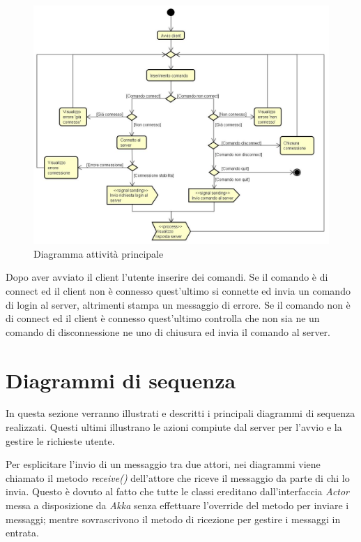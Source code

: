 \documentclass[a4paper]{article}
\begin{document}
		\begin{figure} [H]
			\centering
			\includegraphics[width=\textwidth]{ST/Attivita/attivitaPrincipale.jpg}
			\caption{Diagramma attività principale}
		\end{figure}
		Dopo aver avviato il client l'utente inserire dei comandi. Se il comando è di connect ed il client non è connesso quest'ultimo si connette ed invia un comando di login al server, altrimenti stampa un messaggio di errore. Se il comando non è di connect ed il client è connesso quest'ultimo controlla che non sia ne un comando di disconnessione ne uno di chiusura ed invia il comando al server.
		
	\newpage 
	\section{Diagrammi di sequenza}
        In questa sezione verranno illustrati e descritti i principali diagrammi di sequenza realizzati. Questi ultimi illustrano le azioni compiute dal server per l'avvio e la gestire le richieste utente.
        
        Per esplicitare l'invio di un messaggio tra due attori, nei diagrammi viene chiamato il metodo \textit{receive()} dell'attore che riceve il messaggio 
        da parte di chi lo invia.
        Questo è dovuto al fatto che tutte le classi ereditano dall'interfaccia \textit{Actor} messa a disposizione da \textit{Akka} senza effettuare 
        l'override del metodo per inviare i messaggi; mentre sovrascrivono il metodo di ricezione per gestire i messaggi in entrata.
        
\end{document}
